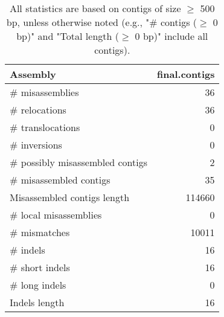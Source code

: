 \documentclass[12pt,a4paper]{article}
\begin{document}
\begin{table}[ht]
\begin{center}
\caption{All statistics are based on contigs of size $\geq$ 500 bp, unless otherwise noted (e.g., "\# contigs ($\geq$ 0 bp)" and "Total length ($\geq$ 0 bp)" include all contigs).}
\begin{tabular}{|l*{1}{|r}|}
\hline
Assembly & final.contigs \\ \hline
\# misassemblies & 36 \\ \hline
\hspace{5mm}\# relocations & 36 \\ \hline
\hspace{5mm}\# translocations & 0 \\ \hline
\hspace{5mm}\# inversions & 0 \\ \hline
\# possibly misassembled contigs & 2 \\ \hline
\# misassembled contigs & 35 \\ \hline
Misassembled contigs length & 114660 \\ \hline
\# local misassemblies & 0 \\ \hline
\# mismatches & 10011 \\ \hline
\# indels & 16 \\ \hline
\hspace{5mm}\# short indels & 16 \\ \hline
\hspace{5mm}\# long indels & 0 \\ \hline
Indels length & 16 \\ \hline
\end{tabular}
\end{center}
\end{table}
\end{document}

